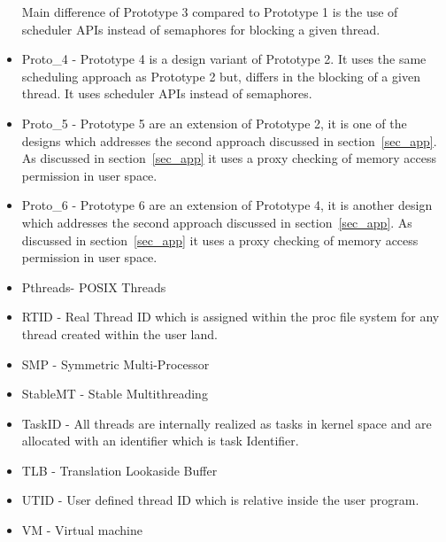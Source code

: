 \begin{itemize}
Main difference of Prototype 3 compared to Prototype 1 is the use of scheduler APIs instead of semaphores for blocking a given thread. 
\item {Proto\_4} - Prototype 4 is a design variant of Prototype 2. It uses the same scheduling approach as Prototype 2 but, differs in the blocking of a given thread. 
It uses scheduler APIs instead of semaphores. 
\item {Proto\_5} - Prototype 5 are an extension of Prototype 2, it is one of the designs which addresses the second approach discussed in section~\ref{sec_app}. 
As discussed in section~\ref{sec_app} it uses a proxy checking of memory access permission in user space.
\item {Proto\_6} - Prototype 6 are an extension of Prototype 4, it is another design which addresses the second approach discussed in section~\ref{sec_app}. 
As discussed in section~\ref{sec_app} it uses a proxy checking of memory access permission in user space.
\item Pthreads- POSIX Threads
\item RTID - Real Thread ID which is assigned within the proc file system for any thread created within the user land. 
\item SMP		- Symmetric Multi-Processor
\item StableMT 	- Stable Multithreading
\item TaskID 	- All threads are internally realized as tasks in kernel space and are allocated with an identifier which is task Identifier.
\item TLB	- Translation Lookaside Buffer
\item UTID 	- User defined thread ID which is relative inside the user program.
\item VM	-	Virtual machine
\end{itemize}
